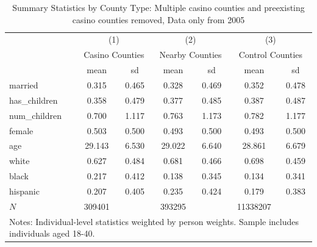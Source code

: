 \begin{table}[htbp]\centering
\def\sym#1{\ifmmode^{#1}\else\(^{#1}\)\fi}
\caption{Summary Statistics by County Type: Multiple casino counties and preexisting casino counties removed, Data only from 2005}
\begin{tabular}{l*{3}{cc}}
\hline\hline
            &\multicolumn{2}{c}{(1)}  &\multicolumn{2}{c}{(2)}  &\multicolumn{2}{c}{(3)}  \\
            &\multicolumn{2}{c}{Casino Counties}&\multicolumn{2}{c}{Nearby Counties}&\multicolumn{2}{c}{Control Counties}\\
            &        mean&          sd&        mean&          sd&        mean&          sd\\
\hline
married     &       0.315&       0.465&       0.328&       0.469&       0.352&       0.478\\
has\_children&       0.358&       0.479&       0.377&       0.485&       0.387&       0.487\\
num\_children&       0.700&       1.117&       0.763&       1.173&       0.782&       1.177\\
female      &       0.503&       0.500&       0.493&       0.500&       0.493&       0.500\\
age         &      29.143&       6.530&      29.022&       6.640&      28.861&       6.679\\
white       &       0.627&       0.484&       0.681&       0.466&       0.698&       0.459\\
black       &       0.217&       0.412&       0.138&       0.345&       0.134&       0.341\\
hispanic    &       0.207&       0.405&       0.235&       0.424&       0.179&       0.383\\
\hline
\(N\)       &      309401&            &      393295&            &    11338207&            \\
\hline\hline
\multicolumn{7}{l}{\footnotesize Notes: Individual-level statistics weighted by person weights. Sample includes individuals aged 18-40.}\\
\end{tabular}
\end{table}
